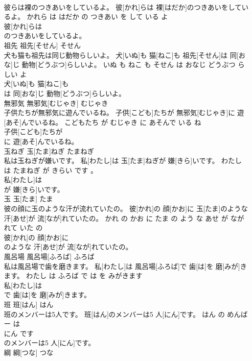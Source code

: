 \documentclass[8pt]{extreport}
\begin{document}
\begin{CJK}{UTF8}{min}
\\	彼らは裸のつきあいをしているよ。	彼[かれ]らは 裸[はだか]のつきあいをしているよ。	かれら は はだか の つきあい を して いる よ	
\\	彼[かれ]らは
\\	のつきあいをしているよ。			
\\	祖先	祖先[そせん]	そせん	
\\	犬も猫も祖先は同じ動物らしいよ。	犬[いぬ]も 猫[ねこ]も 祖先[そせん]は 同[おな]じ 動物[どうぶつ]らしいよ。	いぬ も ねこ も そせん は おなじ どうぶつ らしい よ	
\\	犬[いぬ]も 猫[ねこ]も
\\	は 同[おな]じ 動物[どうぶつ]らしいよ。			
\\	無邪気	無邪気[むじゃき]	むじゃき	
\\	子供たちが無邪気に遊んでいるね。	子供[こども]たちが 無邪気[むじゃき]に 遊[あそ]んでいるね。	こどもたち が むじゃき に あそんで いる ね	
\\	子供[こども]たちが
\\	に 遊[あそ]んでいるね。			
\\	玉ねぎ	玉[たま]ねぎ	たまねぎ	
\\	私は玉ねぎが嫌いです。	私[わたし]は 玉[たま]ねぎが 嫌[きら]いです。	わたし は たまねぎ が きらい です 。	
\\	私[わたし]は
\\	が 嫌[きら]いです。			
\\	玉	玉[たま]	たま	
\\	彼の顔に玉のような汗が流れていたの。	彼[かれ]の 顔[かお]に 玉[たま]のような 汗[あせ]が 流[なが]れていたの。	かれ の かお に たま の よう な あせ が ながれて いた の	
\\	彼[かれ]の 顔[かお]に
\\	のような 汗[あせ]が 流[なが]れていたの。			
\\	風呂場	風呂場[ふろば]	ふろば	
\\	私は風呂場で歯を磨きます。	私[わたし]は 風呂場[ふろば]で 歯[は]を 磨[みが]きます。	わたし は ふろば で は を みがきます	
\\	私[わたし]は
\\	で 歯[は]を 磨[みが]きます。			
\\	班	班[はん]	はん	
\\	班のメンバーは5人です。	班[はん]のメンバーは5 人[にん]です。	はん の めんばー は 
\\	にん です	
\\	のメンバーは5 人[にん]です。			
\\	綱	綱[つな]	つな	

\end{CJK}
\end{document}

